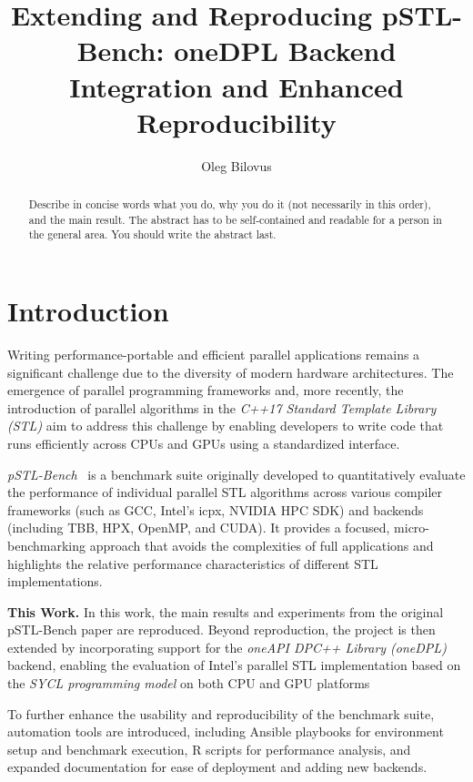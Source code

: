 \documentclass[sigconf]{acmart}
\title{Extending and Reproducing pSTL-Bench: oneDPL Backend Integration and Enhanced Reproducibility}
\author{Oleg Bilovus}
\affiliation{
  \institution{Department of Computer Science, University of Salerno}
  \city{Fisciano (SA)}
  \country{Italy}
}
\newcommand{\mypar}[1]{{\bf #1.}}
\begin{document}
\begin{abstract}
      Describe in concise words what you do, why you do it (not necessarily
      in this order), and the main result.  The abstract has to be
      self-contained and readable for a person in the general area. You
      should write the abstract last.
\end{abstract}

\maketitle

\section{Introduction}\label{sec:intro}
Writing performance-portable and efficient parallel applications remains a
significant challenge due to the diversity of modern hardware architectures.
The emergence of parallel programming frameworks and, more recently, the
introduction of parallel algorithms in the \textit{C++17 Standard Template
      Library (STL)} aim to address this challenge by enabling developers to write
code that runs efficiently across CPUs and GPUs using a standardized interface.

\textit{pSTL-Bench}~\cite{pSTL-Bench} is a benchmark suite originally developed to
quantitatively evaluate the performance of individual parallel STL algorithms
across various compiler frameworks (such as GCC, Intel's icpx, NVIDIA HPC SDK)
and backends (including TBB, HPX, OpenMP, and CUDA). It provides a focused,
micro-benchmarking approach that avoids the complexities of full applications
and highlights the relative performance characteristics of different STL
implementations.

\mypar{This Work} In this work, the main results and experiments from the original pSTL-Bench
paper are reproduced. Beyond reproduction, the project is then extended by
incorporating support for the \textit{oneAPI DPC++ Library (oneDPL)} backend,
enabling the evaluation of Intel’s parallel STL implementation based on the
\textit{SYCL programming model} on both CPU and GPU platforms

To further enhance the usability and reproducibility of the benchmark suite,
automation tools are introduced, including Ansible playbooks for environment
setup and benchmark execution, R scripts for performance analysis, and expanded
documentation for ease of deployment and adding new backends.
\end{document}
